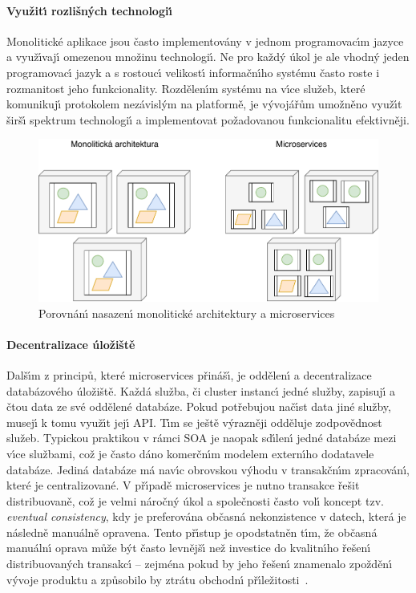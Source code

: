 \paragraph{Využit\'{\i} rozlišn\'ych technologi\'{\i}}
Monolitické aplikace jsou často implementovány v jednom programovac\'{\i}m jazyce
a využ\'{\i}vaj\'{\i} omezenou množinu technologi\'{\i}. Ne pro každ\'y úkol je ale vhodn\'y
jeden programovac\'{\i} jazyk a s rostouc\'{\i} velikost\'{\i} informačn\'{\i}ho systému často roste
i rozmanitost jeho funkcionality. Rozdělen\'{\i}m systému na v\'{\i}ce služeb, které
komunikuj\'{\i} protokolem nezávisl\'ym na platformě, je v\'yvojářům umožněno využ\'{\i}t
širš\'{\i} spektrum technologi\'{\i} a implementovat požadovanou funkcionalitu
efektivněji.

\begin{figure}
    \centering
    \includegraphics[keepaspectratio=true, width=0.8\linewidth]{figures/microservices-deployment.pdf}
    \caption{Porovnán\'{\i} nasazen\'{\i} monolitické architektury a microservices~\cite{lewis2014microservices}}
    \label{fig:microservices-deployment}
\end{figure}

\paragraph{Decentralizace úložiště}
Dalš\'{\i}m z principů, které microservices přináš\'{\i}, je oddělen\'{\i} a decentralizace
databázového úložiště. Každá služba, či cluster instanc\'{\i} jedné služby, zapisuj\'{\i}
a čtou data ze své oddělené databáze. Pokud potřebujou nač\'{\i}st data jiné služby,
musej\'{\i} k tomu využ\'{\i}t jej\'{\i} \gls{API}. T\'{\i}m se ještě v\'yrazněji odděluje zodpovědnost služeb.
Typickou praktikou v rámci \gls{SOA} je naopak sd\'{\i}len\'{\i} jedné databáze mezi v\'{\i}ce službami,
což je často dáno komerčn\'{\i}m modelem extern\'{\i}ho dodatavele databáze. Jediná databáze
má nav\'{\i}c obrovskou v\'yhodu v transakčn\'{\i}m zpracován\'{\i}, které je centralizované.
V př\'{\i}padě microservices je nutno transakce řešit distribuovaně, což je velmi náročn\'y
úkol a společnosti často vol\'{\i} koncept tzv. \textit{eventual consistency}, kdy je
preferována občasná nekonzistence v datech, která je následně manuálně opravena.
Tento př\'{\i}stup je opodstatněn t\'{\i}m, že občasná manuáln\'{\i} oprava může b\'yt
často levnějš\'{\i} než investice do kvalitn\'{\i}ho řešen\'{\i} distribuovan\'ych transakc\'{\i} –
zejména pokud by jeho řešen\'{\i} znamenalo zpožděn\'{\i} v\'yvoje produktu a způsobilo
by ztrátu obchodn\'{\i} př\'{\i}ležitosti~\cite{lewis2014microservices}.

